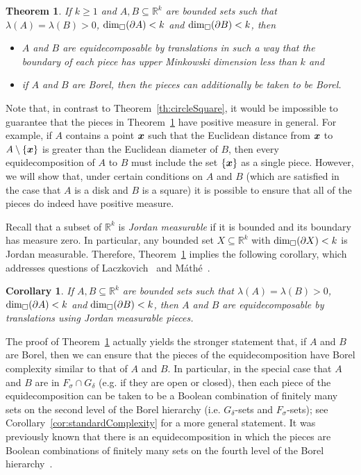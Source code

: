 \documentclass[12pt,a4paper]{amsart}
\numberwithin{equation}{section}
\newtheorem{theorem}[equation]{Theorem}
\newtheorem{corollary}[equation]{Corollary}
\theoremstyle{definition}
\begin{document}
\begin{theorem}
\label{th:main}
If $k\geq1$ and $A,B\subseteq \mathbb{R}^k$ are bounded sets such that $\lambda(A)=\lambda(B)>0$, $\operatorname{dim}_\square(\partial A)<  k$ and $\operatorname{dim}_\square(\partial B)<k$, then 
\begin{itemize}
\item[(a)] $A$ and $B$ are equidecomposable by translations in such a way that the boundary of each piece has upper Minkowski dimension less than $k$ and
\item[(b)] if $A$ and $B$ are Borel, then the pieces can additionally be taken to be Borel. 
\end{itemize}
\end{theorem}

Note that, in contrast to Theorem~\ref{th:circleSquare}, it would be impossible to guarantee that the pieces in Theorem~\ref{th:main} have positive measure in general. For example, if $A$ contains a point $\boldsymbol{x}$ such that the Euclidean distance from $\boldsymbol{x}$ to $A\setminus\{\boldsymbol{x}\}$ is greater than the Euclidean diameter of $B$, then every equidecomposition of $A$ to $B$ must include the set $\{\boldsymbol{x}\}$ as a single piece. However, we will show that, under certain conditions on $A$ and $B$ (which are satisfied in the case that $A$ is a disk and $B$ is a square) it is possible to ensure that all of the pieces do indeed have positive measure.

Recall that a subset of $\mathbb{R}^k$ is \emph{Jordan measurable} if it is bounded and its boundary has measure zero. In particular, any bounded set $X\subseteq\mathbb{R}^k$ with $\operatorname{dim}_\square(\partial X)<k$ is Jordan measurable. Therefore, Theorem~\ref{th:main} implies the following corollary, which addresses questions of Laczkovich~\cite{LaczkovichTalk} and M\'{a}th\'{e}~\cite[Question~6.2]{Mathe18icm}. 

\begin{corollary}
\label{cor:Jmeas}
If $A,B\subseteq \mathbb{R}^k$ are bounded sets such that $\lambda(A)=\lambda(B)>0$, $\operatorname{dim}_\square(\partial A)<k$ and $\operatorname{dim}_\square(\partial B)<k$, then $A$ and $B$ are equidecomposable by translations using Jordan measurable pieces.
\end{corollary}

The proof of Theorem~\ref{th:main} actually yields the stronger statement that, if $A$ and $B$ are Borel, then we can ensure that the pieces of the equidecomposition have Borel complexity similar to that of $A$ and $B$. In particular, in the special case that $A$ and $B$ are in $F_\sigma\cap G_\delta$ (e.g. if they are open or closed), then each piece of the equidecomposition can be taken to be a Boolean combination of finitely many sets on the second level of the Borel hierarchy (i.e. $G_\delta$-sets and $F_\sigma$-sets); see Corollary~\ref{cor:standardComplexity} for a more general statement. It was previously known that there is an equidecomposition in which the pieces are Boolean combinations of finitely many sets on the fourth level of the Borel hierarchy~\cite[p.~583]{MarksUnger17}.
\end{document}
